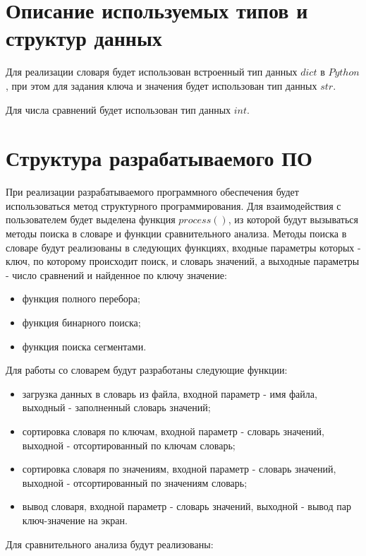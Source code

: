 \section{Описание используемых типов и структур данных}

Для реализации словаря будет использован встроенный тип данных $dict$ в $Python$, при этом для задания ключа и значения будет использован тип данных $str$.

Для числа сравнений будет использован тип данных $int$.

\section{Структура разрабатываемого ПО}

При реализации разрабатываемого программного обеспечения будет использоваться метод структурного программирования. Для взаимодействия с пользователем будет выделена функция $process()$, из которой будут вызываться методы поиска в словаре и функции сравнительного анализа. Методы поиска в словаре будут реализованы в следующих функциях, входные параметры которых - ключ, по которому происходит поиск, и словарь значений, а выходные параметры - число сравнений и найденное по ключу значение:
\begin{itemize}
	\item функция полного перебора;
	\item функция бинарного поиска;
	\item функция поиска сегментами.
\end{itemize}

Для работы со словарем будут разработаны следующие функции:

\begin{itemize}
	\item загрузка данных в словарь из файла, входной параметр - имя файла, выходный - заполненный словарь значений;
	\item сортировка словаря по ключам, входной параметр - словарь значений, выходной - отсортированный по ключам словарь;
	\item сортировка словаря по значениям, входной параметр - словарь значений, выходной - отсортированный по значениям словарь;
	\item вывод словаря, входной параметр - словарь значений, выходной - вывод пар ключ-значение на экран. 
\end{itemize}

Для сравнительного анализа будут реализованы:

